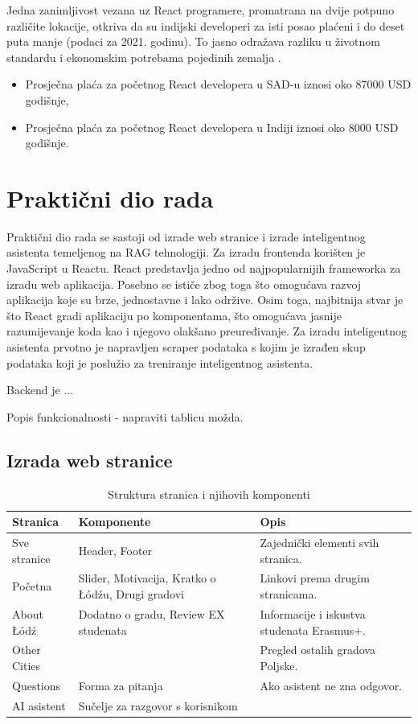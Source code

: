 \documentclass[]{foi}
\begin{document}
Jedna zanimljivost vezana uz React programere, promatrana na dvije potpuno različite lokacije, otkriva da su indijski developeri za isti posao plaćeni i do deset puta manje (podaci za 2021. godinu). 
To jasno odražava razliku u životnom standardu i ekonomskim potrebama pojedinih zemalja \cite{simplilearn2025react}.
\begin{itemize}
    \item Prosječna plaća za početnog React developera u SAD-u iznosi oko 87000 USD godišnje,
    \item Prosječna plaća za početnog React developera u Indiji iznosi oko 8000 USD godišnje.
\end{itemize}



\chapter{Praktični dio rada}
Praktični dio rada se sastoji od izrade web stranice i izrade inteligentnog asistenta temeljenog na RAG tehnologiji. Za izradu frontenda korišten je
JavaScript u Reactu. React predstavlja jedno od najpopularnijih frameworka za izradu web aplikacija. Posebno se ističe zbog toga što omogućava
razvoj aplikacija koje su brze, jednostavne i lako održive. Osim toga, najbitnija stvar je što React gradi aplikaciju po komponentama, što omogućava
jasnije razumijevanje koda kao i njegovo olakšano preuređivanje. Za izradu inteligentnog asistenta prvotno je napravljen scraper podataka s kojim je
izrađen skup podataka koji je poslužio za treniranje inteligentnog asistenta.

Backend je ...

Popis funkcionalnosti - napraviti tablicu možda.

\section{Izrada web stranice}

\begin{table}[h!]
    \centering
    \begin{tabular}{|l|p{7cm}|p{7cm}|}
    \hline
    \textbf{Stranica} & \textbf{Komponente} & \textbf{Opis} \\
    \hline
    Sve stranice & Header, Footer & Zajednički elementi svih stranica. \\
    \hline
    Početna & Slider, Motivacija, Kratko o Łódźu, Drugi gradovi & Linkovi prema drugim stranicama. \\
    \hline
    About \mbox{Łódź} & Dodatno o gradu, Review EX studenata & Informacije i iskustva studenata Erasmus+. \\
    \hline
    Other Cities &  & Pregled ostalih gradova Poljske. \\
    \hline
    Questions & Forma za pitanja & Ako asistent ne zna odgovor. \\
    \hline
    AI asistent & Sučelje za razgovor s korisnikom &  \\
    \hline
    \end{tabular}
    \caption{Struktura stranica i njihovih komponenti}
\end{table}
\end{document}

